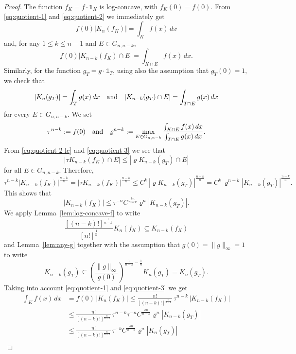 \documentclass[10pt,a4paper]{amsart}
\newcommand{\ls}{\leqslant}
\begin{document}
\begin{proof}The function $f_K=f\cdot\mathds{1}_K$ is log-concave, with $f_K(0)=f(0)$.
From \eqref{eq:quotient-1} and \eqref{eq:quotient-2} we immediately get
\begin{equation}\label{eq:quotient-1-lc}
f(0)|K_n(f_K)|=\int_Kf(x)\,dx
\end{equation}
and, for any $1\ls k\ls n-1$ and $E\in G_{n,n-k}$,
\begin{equation}\label{eq:quotient-2-lc}
f(0)|K_{n-k}(f_K)\cap E|=\int_{K\cap E}f(x)\,dx.
\end{equation}
Similarly, for the function $g_T=g\cdot\mathds{1}_T$, using also the assumption that $g_T(0)=1$, we check that
\begin{equation}\label{eq:quotient-3}|K_n(g_T)| =\int_Tg(x)\,dx\quad\hbox{and}\quad
|K_{n-k}(g_T)\cap E| =\int_{T\cap E}g(x)\,dx\end{equation}
for every $E\in G_{n,n-k}$.
We set $$\tau^{n-k}:=f(0)\quad\hbox{and}\quad\varrho^{n-k}:=\max_{E\in G_{n,n-k}} \frac{\int_{K\cap E} f(x)\,dx}{\int_{T\cap E} g(x)\,dx}.$$
From \eqref{eq:quotient-2-lc} and \eqref{eq:quotient-3} we see that
$$|\tau K_{n-k}(f_{K})\cap E|\ls |\varrho K_{n-k}(g_{T})\cap E|$$
for all $E\in G_{n,n-k}$. Therefore,
$$\tau^{n-k}|K_{n-k}(f_K)|^{\frac{n-k}{n}}=|\tau K_{n-k}(f_K)|^{\frac{n-k}{n}}\ls C^k\,|\varrho K_{n-k}(g_T)|^{\frac{n-k}{n}}=C^k\,\varrho^{n-k}|K_{n-k}(g_T)|^{\frac{n-k}{n}}.$$
This shows that
$$|K_{n-k}(f_K)|\ls \tau^{-n}C^{\frac{kn}{n-k}}\varrho^n|K_{n-k}(g_T)|.$$
We apply Lemma~\ref{lem:log-concave-f} to write
\begin{equation}\label{eq:quotient-4} \frac{[(n-k)!]^{\frac{1}{n-k}}}{[n!]^{\frac{1}{n}}}K_n(f_K)\subseteq
K_{n-k}(f_K)\end{equation}
and Lemma~\ref{lem:any-g} together with the assumption that $g(0)=\|g\|_{\infty}=1$ to write
\begin{equation}\label{eq:quotient-5}K_{n-k}(g_T)\subseteq
\left(\frac{\|g\|_{\infty}}{g(0)}\right)^{\frac{1}{n-k}-\frac{1}{n}}K_{n}(g_T)=K_n(g_T).
\end{equation}
Taking into account \eqref{eq:quotient-1} and \eqref{eq:quotient-3} we get
\begin{align*}
\int_Kf(x)\,dx &=f(0)\,|K_n(f_K)|\ls \frac{n!}{[(n-k)!]^{\frac{n}{n-k}}}\,\tau^{n-k}\,|K_{n-k}(f_K)|\\
&\ls \frac{n!}{[(n-k)!]^{\frac{n}{n-k}}}\, \tau^{n-k}\tau^{-n} C^{\frac{kn}{n-k}}\varrho^{n}|K_{n-k}(g_T)|\\
&\ls \frac{n!}{[(n-k)!]^{\frac{n}{n-k}}}\, \tau^{-k} C^{\frac{kn}{n-k}}\varrho^{n}|K_n(g_T)|\\

\end{align*}
\end{proof}
\end{document}

